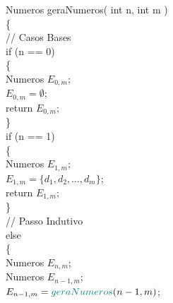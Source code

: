 \documentclass[twoside]{article}
\begin{document}
\begin{multicols}{2}
\noindent
{\color[rgb]{0,0,1} Numeros} {\color[rgb]{0,0.5,0.5} geraNumeros}( {\color[rgb]{0,0,1} int} n, {\color[rgb]{0,0,1} int} m )\\
\{\\
\hspace*{5mm} {\color[rgb]{0,0.5,0}// Casos Bases}\\
\hspace*{5mm} {\color[rgb]{0.7,0.3,0} if} (n == 0)\\
\hspace*{5mm} \{\\
\hspace*{10mm} {\color[rgb]{0,0,1} Numeros} $E_{0,m}$;\\
\hspace*{10mm} $E_{0,m} = \emptyset$;\\
\hspace*{10mm} {\color[rgb]{0.5,0,1} return}  $E_{0,m}$;\\
\hspace*{5mm} \}\\
\hspace*{5mm} {\color[rgb]{0.7,0.3,0} if} (n == 1)\\
\hspace*{5mm} \{\\
\hspace*{10mm} {\color[rgb]{0,0,1} Numeros} $E_{1,m}$;\\
\hspace*{10mm} $E_{1,m} = \{d_1,d_2,\dots,d_m\}$;\\
\hspace*{10mm} {\color[rgb]{0.5,0,1} return} $E_{1,m}$;\\
\hspace*{5mm} \}\\
\hspace*{5mm} {\color[rgb]{0,0.5,0}// Passo Indutivo}\\
\hspace*{5mm} {\color[rgb]{0.7,0.3,0} else}\\
\hspace*{5mm} \{\\
\hspace*{10mm} {\color[rgb]{0,0,1} Numeros} $E_{n,m}$;\\
\hspace*{10mm} {\color[rgb]{0,0,1} Numeros} $E_{n-1,m}$;\\
\hspace*{10mm} $E_{n-1,m} = {\color[rgb]{0,0.5,0.5} geraNumeros}(n-1,m)$;\\

\end{multicols}
\end{document}
